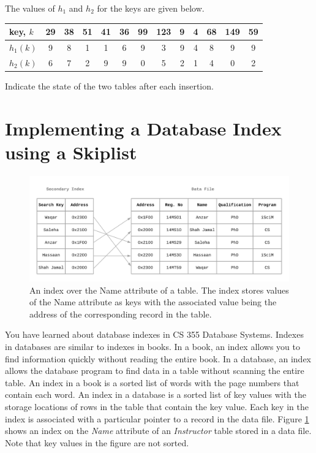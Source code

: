 \documentclass[addpoints]{exam}
\begin{document}
\begin{questions}
\begin{parts}
    The values of $h_1$ and $h_2$ for the keys are given below.
    \begin{center}
      \begin{tabular}{|l||*{12}{c|}}
        \hline
        key, $k$ & 29 & 38 & 51 & 41 & 36 & 99 & 123 &  9 &  4 & 68 & 149 & 59\\\hline\hline
        $h_1(k)$  & 9 & 8 & 1 & 1 & 6 & 9 & 3 &  9 &  4 & 8 & 9 & 9\\\hline
        $h_2(k)$  & 6 & 7 & 2 & 9 & 9 & 0 & 5 &  2 &  1 & 4 & 0 & 2\\\hline
      \end{tabular}
    \end{center}
    
    Indicate the state of the two tables after each insertion.
  \end{parts}
\end{questions}

\newpage
\part{Implementing a Database Index using a Skiplist}

\begin{figure}[!h]
  \centering
  \includegraphics[width=.8\linewidth]{index}
  \caption{An index over the Name attribute of a table. The index stores values of the Name attribute as keys with the associated value being the address of the corresponding record in the table.}
  \label{fig:index}
\end{figure}

You have learned about database indexes in CS 355 Database Systems. Indexes in databases are similar to indexes in books. In a book, an index allows you to find information quickly without reading the entire book. In a database, an index allows the database program to find data in a table without scanning the entire table. An index in a book is a sorted list of words with the page numbers that contain each word. An index in a database is a sorted list of key values with the storage locations of rows in the table that contain the key value. Each key in the index is associated with a particular pointer to a record in the data file. Figure \ref{fig:index} shows an index on the \textit{Name} attribute of an \textit{Instructor} table stored in a data file. Note that key values in the figure are not sorted.
 
\end{document}
